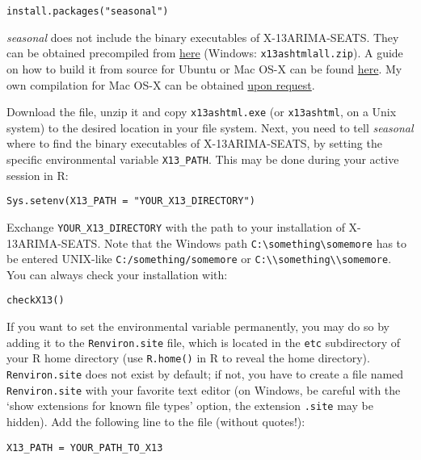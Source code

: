 \begin{verbatim}
install.packages("seasonal")
\end{verbatim}

\emph{seasonal} does not include the binary executables of
X-13ARIMA-SEATS. They can be obtained precompiled from
\href{http://www.census.gov/srd/www/x13as/x13down_pc.html}{here}
(Windows: \texttt{x13ashtmlall.zip}). A guide on how to build it from
source for Ubuntu or Mac OS-X can be found
\href{http://askubuntu.com/questions/444354/how-do-i-install-x13-arima-seats-for-rstudio-from-source}{here}.
My own compilation for Mac OS-X can be obtained
\href{mailto:christoph.sax@gmail.com}{upon request}.

Download the file, unzip it and copy \texttt{x13ashtml.exe} (or
\texttt{x13ashtml}, on a Unix system) to the desired location in your
file system. Next, you need to tell \emph{seasonal} where to find the
binary executables of X-13ARIMA-SEATS, by setting the specific
environmental variable \texttt{X13\_PATH}. This may be done during your
active session in R:

\begin{verbatim}
Sys.setenv(X13_PATH = "YOUR_X13_DIRECTORY")
\end{verbatim}

Exchange \texttt{YOUR\_X13\_DIRECTORY} with the path to your
installation of X-13ARIMA-SEATS. Note that the Windows path
\texttt{C:\textbackslash{}something\textbackslash{}somemore} has to be
entered UNIX-like \texttt{C:/something/somemore} or
\texttt{C:\textbackslash{}\textbackslash{}something\textbackslash{}\textbackslash{}somemore}.
You can always check your installation with:

\begin{verbatim}
checkX13()
\end{verbatim}

If you want to set the environmental variable permanently, you may do so
by adding it to the \texttt{Renviron.site} file, which is located in the
\texttt{etc} subdirectory of your R home directory (use
\texttt{R.home()} in R to reveal the home directory).
\texttt{Renviron.site} does not exist by default; if not, you have to
create a file named \texttt{Renviron.site} with your favorite text
editor (on Windows, be careful with the `show extensions for known file
types' option, the extension \texttt{.site} may be hidden). Add the
following line to the file (without quotes!):

\begin{verbatim}
X13_PATH = YOUR_PATH_TO_X13
\end{verbatim}

